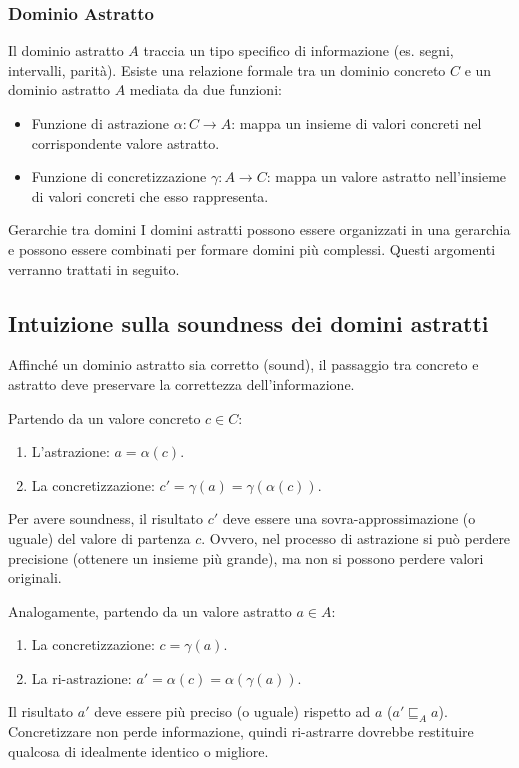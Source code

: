 \subsubsection{Dominio Astratto}
Il dominio astratto $A$ traccia un tipo specifico di informazione
(es. segni, intervalli, parità).
Esiste una relazione formale tra un dominio concreto $C$ e un dominio astratto
$A$ mediata da due funzioni:
\begin{itemize}
    \item Funzione di astrazione $\alpha: C \rightarrow A$: mappa un insieme
    di valori concreti nel corrispondente valore astratto.
    \item Funzione di concretizzazione $\gamma: A \rightarrow C$: mappa un
    valore astratto nell'insieme di valori concreti che esso rappresenta.
\end{itemize}

\begin{nota}{Gerarchie tra domini}{}
I domini astratti possono essere organizzati in una gerarchia e possono essere
combinati per formare domini più complessi.
Questi argomenti verranno trattati in seguito.
\end{nota}

\subsection{Intuizione sulla soundness dei domini astratti}

Affinché un dominio astratto sia corretto (sound), il passaggio tra
concreto e astratto deve preservare la correttezza dell'informazione.

Partendo da un valore concreto $c \in C$:
\begin{enumerate}
    \item L'astrazione: $a = \alpha(c)$.
    \item La concretizzazione: $c' = \gamma(a) = \gamma(\alpha(c))$.
\end{enumerate}
Per avere soundness, il risultato $c'$ deve essere una sovra-approssimazione
(o uguale) del valore di partenza $c$.
Ovvero, nel processo di astrazione si può perdere precisione (ottenere
un insieme più grande), ma non si possono perdere valori originali.

Analogamente, partendo da un valore astratto $a \in A$:
\begin{enumerate}
    \item La concretizzazione: $c = \gamma(a)$.
    \item La ri-astrazione: $a' = \alpha(c) = \alpha(\gamma(a))$.
\end{enumerate}
Il risultato $a'$ deve essere più preciso (o uguale) rispetto ad
$a$ ($a' \sqsubseteq_A a$). Concretizzare non perde informazione, quindi
ri-astrarre dovrebbe restituire qualcosa di idealmente identico o migliore.

